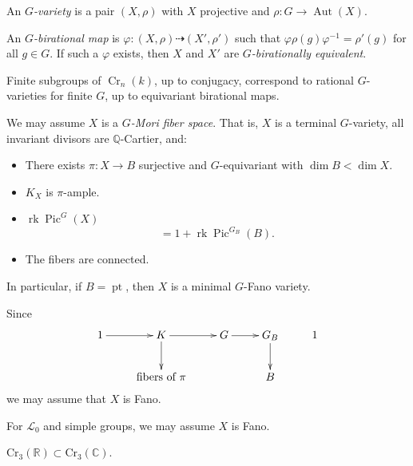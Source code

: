 \begin{definition}
\label{definition-g-variety}
An {\it $G$-variety} is a pair
$(X,\rho)$ with $X$ projective and
$\rho:G\to\operatorname{Aut}(X)$.
\end{definition}

\begin{definition}
\label{definition-g-bir}
An {\it $G$-birational map} is
$\varphi:(X,\rho)\dashrightarrow
(X',\rho')$
such that
$\varphi\rho(g)\varphi^{-1}=\rho'(g)$
for all $g\in G$.
If such a $\varphi$ exists,
then $X$ and $X'$ are
{\it $G$-birationally equivalent}.
\end{definition}

\begin{theorem}
\label{theorem-finite-subgroups}
Finite subgroups of
$\operatorname{Cr}_n(k)$,
up to conjugacy,
correspond to rational $G$-varieties
for finite $G$,
up to equivariant birational maps.
\end{theorem}

\begin{definition}
\label{definition-g-mori-fiber-space}
We may assume $X$ is a
{\it $G$-Mori fiber space}.
That is, $X$ is a terminal $G$-variety,
all invariant divisors are 
$\mathbb{Q}$-Cartier, and:
\begin{itemize}
\item There exists
$\pi:X\to B$ surjective and $G$-equivariant
with $\dim B<\dim X$.
\item $K_X$ is $\pi$-ample.
\item
$\operatorname{rk}\operatorname{Pic}^G(X)$
\[
=1+
\operatorname{rk}\operatorname{Pic}^{G_B}(B).
\]
\item The fibers are connected.
\end{itemize}
\end{definition}

In particular, if $B=\operatorname{pt}$,
then $X$ is a minimal $G$-Fano
variety.

\begin{remark}
\label{remark-1-k}
Since
$$
\xymatrix{
1\ar[r]&  K\ar[r]\ar[d]&  G \ar[r]& 
G_B\ar[d]& 1\\
&  \text{fibers of }\pi& & B
}
$$
we may assume that $X$ is Fano.

For $\mathcal{L}_0$ and simple
groups, we may assume $X$ is Fano.
\end{remark}


\begin{remark}
\label{remark-cremona-real-containd-complx}
$\text{Cr}_3(\mathbb{R}) \subset 
\text{Cr}_3(\mathbb{C})$.
\end{remark}

